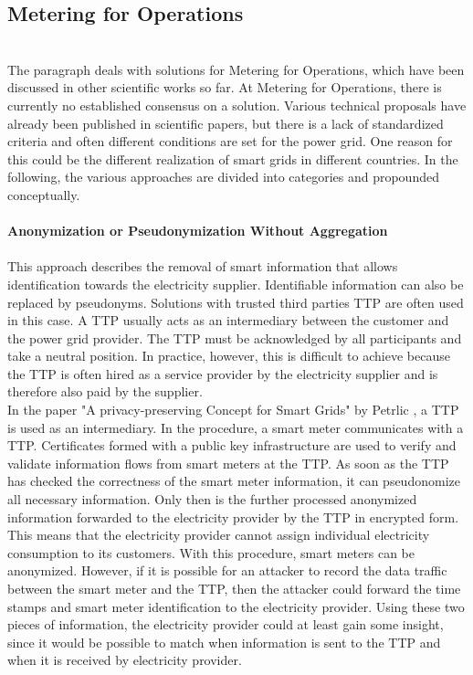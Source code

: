 \subsection{Metering for Operations}
\label{subsec:Meter_for_Op}
\\
The paragraph deals with solutions for Metering for Operations, which have been discussed in other scientific works so far. At Metering for Operations, there is currently no established consensus on a solution. Various technical proposals have already been published in scientific papers, but there is a lack of standardized criteria and often different conditions are set for the power grid. One reason for this could be the different realization of smart grids in different countries. In the following, the various approaches are divided into categories and propounded conceptually.\\
\\
\textbf{Anonymization or Pseudonymization
Without Aggregation}
\\
\\
This approach describes the removal of smart information that allows identification towards the electricity supplier. Identifiable information can also be replaced by pseudonyms. Solutions with trusted third parties \gls{TTP} are often used in this case. A \gls{TTP} usually acts as an intermediary between the customer and the power grid provider. The \gls{TTP} must be acknowledged by all participants and take a neutral position. In practice, however, this is difficult to achieve because the \gls{TTP} is often hired as a service provider by the electricity supplier and is therefore also paid by the supplier.\\
In the paper "A privacy-preserving Concept for Smart Grids" by Petrlic \cite{petrlic2010privacy}, a \gls{TTP} is used as an intermediary. In the procedure, a smart meter communicates with a \gls{TTP}. Certificates formed with a public key infrastructure are used to verify and validate information flows from smart meters at the \gls{TTP}. As soon as the \gls{TTP} has checked the correctness of the smart meter information, it can pseudonomize all necessary information. Only then is the further processed anonymized information forwarded to the electricity provider by the \gls{TTP} in encrypted form. This means that the electricity provider cannot assign individual electricity consumption to its customers. With this procedure, smart meters can be anonymized. 
However, if it is possible for an attacker to record the data traffic between the smart meter and the \gls{TTP}, then the attacker could forward the time stamps and smart meter identification to the electricity provider. Using these two pieces of information, the electricity provider could at least gain some insight, since it would be possible to match when information is sent to the \gls{TTP} and when it is received by electricity provider\cite{finster2014privacy}. \\
